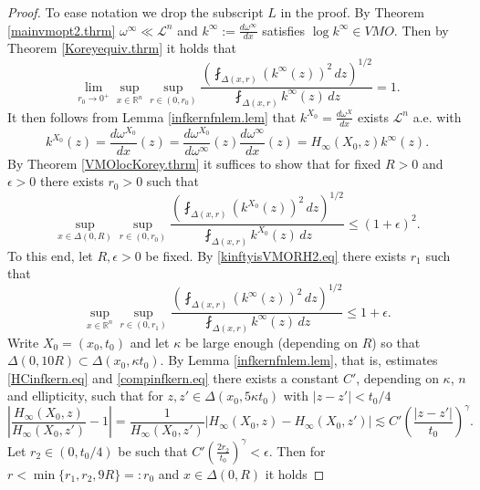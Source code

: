 \documentclass[11pt, a4paper,leqno]{amsart}
\theoremstyle{plain}
\theoremstyle{definition}
\theoremstyle{remark}
\numberwithin{equation}{section}
\newcommand{\rn}{\mathbb{R}^n}
\newcommand{\hm}{\omega}
\begin{document}
\begin{proof}
To ease notation we drop the subscript $L$ in the proof. 
By Theorem \ref{mainvmopt2.thrm} $\hm^\infty \ll \mathcal{L}^n$ and $k^\infty := \frac{d\hm^\infty}{dx}$ satisfies $\log k^\infty \in VMO$. Then by Theorem \ref{Koreyequiv.thrm} it holds that
\begin{equation}\label{kinftyisVMORH2.eq}
\lim_{r_0 \to 0^+} \sup_{x \in \rn} \sup_{r \in (0,r_0)} \frac{\left(\fint_{\Delta(x,r)} (k^\infty(z))^2 \, dz \right)^{1/2}}{\fint_{\Delta(x,r)}  k^\infty(z) \, dz}  = 1.
\end{equation}
It then follows from Lemma \ref{infkernfnlem.lem} that $k^{X_0} = \frac{d \hm^X}{dx}$ exists $\mathcal{L}^n$ a.e. with
\[k^{X_0}(z)= \frac{d\hm^{X_0}}{dx}(z)  = \frac{d\hm^{X_0}}{d\hm^\infty}(z)\frac{d\hm^\infty}{dx}(z)  = H_\infty(X_0, z) k^\infty(z).\]
By Theorem \ref{VMOlocKorey.thrm} it suffices to show that for fixed $R > 0$ and $\epsilon > 0$ there exists $r_0 > 0$ such that
\begin{equation}\label{finitepoleVMOgoal.eq}
\sup_{x \in \Delta(0,R)} \sup_{r \in (0,r_0)}  \frac{\left(\fint_{\Delta(x,r)} (k^{X_0}(z))^2 \, dz \right)^{1/2}}{\fint_{\Delta(x,r)} k^{X_0}(z) \, dz} \le (1 + \epsilon)^2.
\end{equation}
To this end, let $R, \epsilon > 0$ be fixed. By \eqref{kinftyisVMORH2.eq} there exists $r_1$ such that 
\begin{equation}\label{kinftyisVMORH2rone.eq}
\sup_{x \in \rn} \sup_{r \in (0,r_1)} \frac{\left(\fint_{\Delta(x,r)} (k^\infty(z))^2 \, dz \right)^{1/2}}{\fint_{\Delta(x,r)}  k^\infty(z) \, dz} \le 1 + \epsilon.
\end{equation}
Write $X_0 = (x_0,t_0)$ and let $\kappa$ be large enough (depending on $R$) so that $\Delta(0,10R) \subset \Delta(x_0, \kappa t_0)$. By Lemma \ref{infkernfnlem.lem}, that is, estimates \eqref{HCinfkern.eq} and \eqref{compinfkern.eq} there exists a constant $C'$, depending on $\kappa$, $n$ and ellipticity, such that for $z, z' \in \Delta(x_0, 5\kappa t_0)$ with $|z - z'| < t_0/4$
\begin{equation}\label{infkerncombo.eq}
\left| \frac{H_\infty(X_0, z)}{H_\infty(X_0, z')} - 1\right| = \frac{1}{H_\infty( X_0, z')} \left|H_\infty(X_0, z) - H_\infty(X_0, z') \right| \lesssim C' \left(\frac{|z - z'|}{t_0}\right)^{\gamma}. 
\end{equation}
Let $r_2 \in (0, t_0/4) $ be such that $C' \left(\frac{2 r_2}{t_0}\right)^{\gamma} < \epsilon$. Then for $r <  \min\{r_1,r_2, 9R\} =: r_0$ and $x \in \Delta(0,R)$ it holds

\end{proof}
\end{document}
